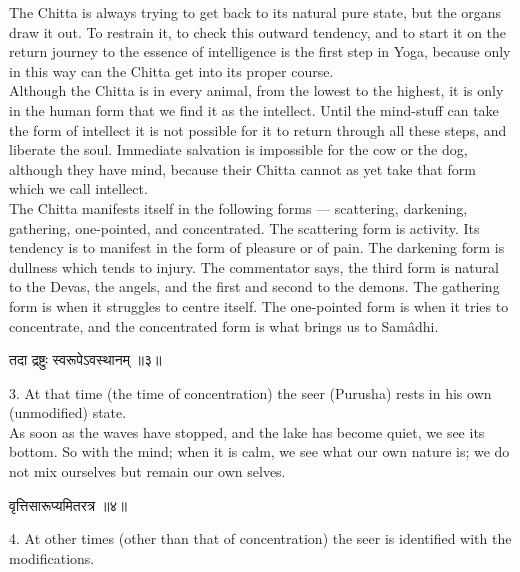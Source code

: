 The Chitta is always trying to get back to its natural pure
state, but the organs draw it out. To restrain it, to check this
outward tendency, and to start it on the return journey to the essence
of intelligence is the first step in Yoga, because only in this way can
the Chitta get into its proper course. \\

Although the Chitta is in every animal, from the lowest to the
highest, it is only in the human form that we find it as the intellect.
Until the mind-stuff can take the form of intellect it is not possible
for it to return through all these steps, and liberate the soul.
Immediate salvation is impossible for the cow or the dog, although they
have mind, because their Chitta cannot as yet take that form which we
call intellect. \\

The Chitta manifests itself in the following forms —
scattering, darkening, gathering, one-pointed, and concentrated. The
scattering form is activity. Its tendency is to manifest in the form of
pleasure or of pain. The darkening form is dullness which tends to
injury. The commentator says, the third form is natural to the Devas,
the angels, and the first and second to the demons. The gathering form
is when it struggles to centre itself. The one-pointed form is when it
tries to concentrate, and the concentrated form is what brings us to
Samâdhi. \\

\begin{center}
\begin{sanskrit}
तदा द्रष्टुः स्वरूपेऽवस्थानम् ॥३॥
\end{sanskrit}
\end{center}
3. At that time (the time of concentration) the seer (Purusha)
rests in his own (unmodified) state. \\

As soon as the waves have stopped, and the lake has become
quiet, we see its bottom. So with the mind; when it is calm, we see
what our own nature is; we do not mix ourselves but remain our own
selves. \\

\begin{center}
\begin{sanskrit}
वृत्तिसारूप्यमितरत्र ॥४॥
\end{sanskrit}
\end{center}
4. At other times (other than that of concentration) the seer
is identified with the modifications. \\

